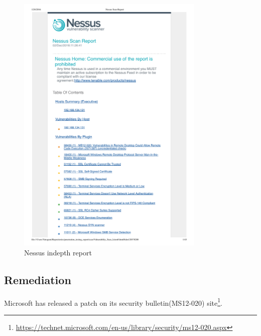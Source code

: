 \documentclass{article}[12 pt,a4paper]
\begin{document}
\begin{figure}
\centering
\includegraphics[width=0.8\textwidth, page=3]{scan/nessus_report}
\caption{Nessus indepth report}
\label{nessus_report}
\end{figure}

 
\subsection{Remediation}

Microsoft has released a patch on its security bulletin(MS12-020) site\footnote{\url{https://technet.microsoft.com/en-us/library/security/ms12-020.aspx}}. 
\end{document}
